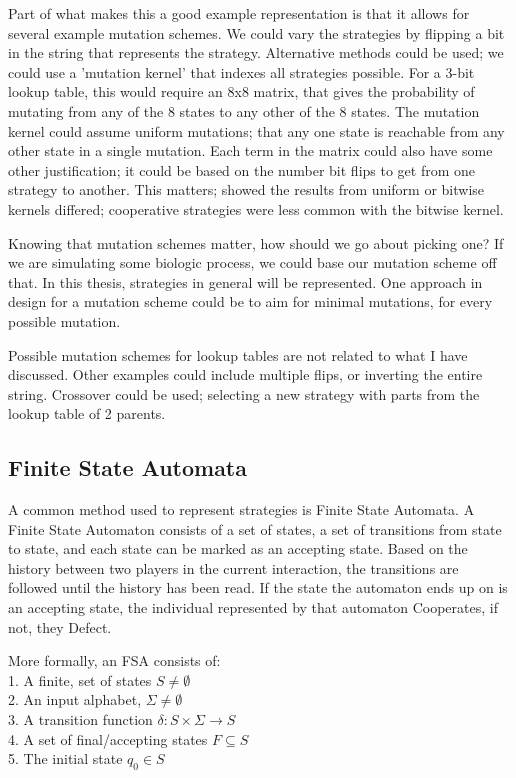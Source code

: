 \documentclass[a4paper,11pt,bcshonoursthesis,singlespace,twoside,thesisdraft,pdflatex]{cssethesis}
\begin{document}
Part of what makes this a good example representation is that it allows for several example mutation schemes. 
We could vary the strategies by flipping a bit in the string that represents the strategy. 
Alternative methods could be used; we could use a 'mutation kernel' that indexes all strategies possible. 
For a 3-bit lookup table, this would require an 8x8 matrix, that gives the probability of mutating from any of the 8 states to any other of the 8 states. 
The mutation kernel could assume uniform mutations; that any one state is reachable from any other state in a single mutation. 
Each term in the matrix could also have some other justification; it could be based on the number bit flips to get from one strategy to another. 
This matters; \citet{garcia:PLoSOne:2012} showed the results from uniform or bitwise kernels differed; cooperative strategies were less common with the bitwise kernel. 

Knowing that mutation schemes matter, how should we go about picking one?
If we are simulating some biologic process, we could base our mutation scheme off that. 
In this thesis, strategies in general will be represented. 
One approach in design for a mutation scheme could be to aim for minimal mutations, for every possible mutation. 

Possible mutation schemes for lookup tables are not related to what I have discussed. 
Other examples could include multiple flips, or inverting the entire string. 
Crossover could be used; selecting a new strategy with parts from the lookup table of 2 parents.

\subsection{Finite State Automata}
A common method used to represent strategies is Finite State Automata. 
A Finite State Automaton consists of a set of states, a set of transitions from state to state, and each state can be marked as an accepting state. 
Based on the history between two players in the current interaction, the transitions are followed until the history has been read. 
If the state the automaton ends up on is an accepting state, the individual represented by that automaton Cooperates, if not, they Defect. 

More formally, an FSA consists of:\\
1. A finite, set of states $S \neq  \emptyset$\\
2. An input alphabet, $\Sigma \neq  \emptyset$\\
3. A transition function $\delta : S \times \Sigma \rightarrow S$\\
4. A set of final/accepting states $F \subseteq S$ \\
5. The initial state $q_0 \in S$
\end{document}
